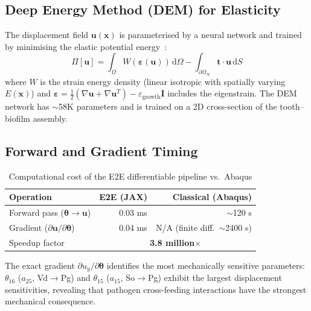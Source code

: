 \documentclass[11pt,a4paper]{article}
\begin{document}
\subsection{Deep Energy Method (DEM) for Elasticity}

The displacement field $\mathbf{u}(\mathbf{x})$ is parameterised by a neural network and trained by minimising the elastic potential energy~\cite{Weinan2018DEM}:
\begin{equation}
  \Pi[\mathbf{u}] = \int_\Omega W(\boldsymbol{\varepsilon}(\mathbf{u}))\,\mathrm{d}\Omega - \int_{\partial\Omega_N} \mathbf{t} \cdot \mathbf{u}\,\mathrm{d}S
  \label{eq:dem}
\end{equation}
where $W$ is the strain energy density (linear isotropic with spatially varying $E(\mathbf{x})$) and $\boldsymbol{\varepsilon} = \frac{1}{2}(\nabla\mathbf{u} + \nabla\mathbf{u}^T) - \varepsilon_\mathrm{growth}\mathbf{I}$ includes the eigenstrain. The DEM network has $\sim$58K parameters and is trained on a 2D cross-section of the tooth--biofilm assembly.

\subsection{Forward and Gradient Timing}

\begin{table}[H]
\centering
\caption{Computational cost of the E2E differentiable pipeline vs.\ Abaqus}
\label{tab:e2e_timing}
\begin{tabular}{lrr}
\toprule
\textbf{Operation} & \textbf{E2E (JAX)} & \textbf{Classical (Abaqus)} \\
\midrule
Forward pass ($\boldsymbol{\theta} \to \mathbf{u}$)         & 0.03 ms & $\sim$120 s \\
Gradient ($\partial\mathbf{u}/\partial\boldsymbol{\theta}$) & 0.04 ms & N/A (finite diff.\ $\sim$2400 s) \\
Speedup factor                                                & \multicolumn{2}{c}{\textbf{3.8 million$\times$}} \\
\bottomrule
\end{tabular}
\end{table}

\noindent The exact gradient $\partial u_y/\partial\boldsymbol{\theta}$ identifies the most mechanically sensitive parameters: $\theta_{16}$ ($a_{25}$, Vd$\to$Pg) and $\theta_{15}$ ($a_{15}$, So$\to$Pg) exhibit the largest displacement sensitivities, revealing that pathogen cross-feeding interactions have the strongest mechanical consequence.
\end{document}
